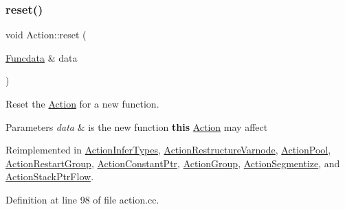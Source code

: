 \subsubsection{\texorpdfstring{reset()}{reset()}}
{\footnotesize\ttfamily void Action\+::reset (\begin{DoxyParamCaption}\item[{\mbox{\hyperlink{class_funcdata}{Funcdata}} \&}]{data }\end{DoxyParamCaption})\hspace{0.3cm}{\ttfamily [virtual]}}



Reset the \mbox{\hyperlink{class_action}{Action}} for a new function. 


\begin{DoxyParams}{Parameters}
{\em data} & is the new function {\bfseries{this}} \mbox{\hyperlink{class_action}{Action}} may affect \\
\hline
\end{DoxyParams}


Reimplemented in \mbox{\hyperlink{class_action_infer_types_ae597b86eb6180b289bd0f32a607c6198}{Action\+Infer\+Types}}, \mbox{\hyperlink{class_action_restructure_varnode_a3dbf44512743482b15794628d8dc40af}{Action\+Restructure\+Varnode}}, \mbox{\hyperlink{class_action_pool_a63d93ad40b2066b0ad88fc83ee50c8e6}{Action\+Pool}}, \mbox{\hyperlink{class_action_restart_group_a8a48151026811fbe97f4aa3eecf67cf0}{Action\+Restart\+Group}}, \mbox{\hyperlink{class_action_constant_ptr_a35b17f96c22959446ca3f94420a9f5a2}{Action\+Constant\+Ptr}}, \mbox{\hyperlink{class_action_group_ae5f0c78e136f9bb5b9bcd6256b8ad097}{Action\+Group}}, \mbox{\hyperlink{class_action_segmentize_a97b99ceaa938b5d08789e2d4e59ae67a}{Action\+Segmentize}}, and \mbox{\hyperlink{class_action_stack_ptr_flow_a2baae3d78de2308e628b17ed3db8a625}{Action\+Stack\+Ptr\+Flow}}.



Definition at line 98 of file action.\+cc.


